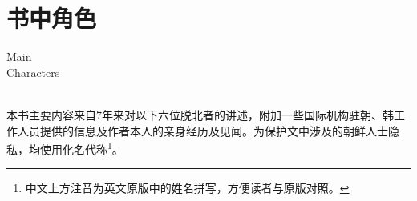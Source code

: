 \fancyhead[RO]{{\tiny{\textcolor{Gray}{\FA \ }}}\thepage}
\fancyhead[LE]{{\tiny{\textcolor{Gray}{\FA \ }}}\thepage}
\fancyfoot[LE,RO]{}
\fancyfoot[LO,CE]{}
\fancyfoot[CO,RE]{}
\chapter*{书中角色}
\vspace{10mm}
\begin{flushright}
	\textcolor{PinYinColor}{\EN \huge{Main\\
	Characters\\
			\ \\}}
\end{flushright}

本书主要内容来自7年来对以下六位脱北者的讲述，附加一些国际机构驻朝、韩工作人员提供的信息及作者本人的亲身经历及见闻。为保护文中涉及的朝鲜人士隐私，均使用化名代称\footnote{中文上方注音为英文原版中的姓名拼写，方便读者与原版对照。}。\\


